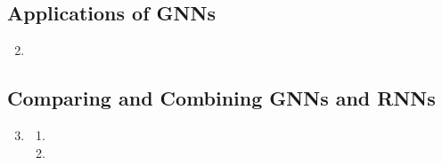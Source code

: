 \documentclass{article}
\begin{document}
\subsection{Applications of GNNs}

\begin{enumerate}[label=\textbf{3.\arabic*}]
  \setcounter{enumi}{1}
  \item
\end{enumerate}

\subsection{Comparing and Combining GNNs and RNNs}

\begin{enumerate}[label=\textbf{3.\arabic*}]
  \setcounter{enumi}{2}
  \item

  \begin{enumerate}[label=\textbf{(\alph*)}]
    \item
    \item
  \end{enumerate}
\end{enumerate}

\end{document}
